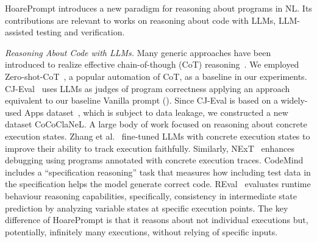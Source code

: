 \documentclass[sigconf]{acmart}
\newcommand{\projName}{HoarePrompt\xspace}
\newcommand{\benchName}{CoCoClaNeL\xspace}
\begin{document}


\projName introduces a new paradigm for reasoning about programs in NL. Its contributions are relevant to works on reasoning about code with LLMs, LLM-assisted testing and verification.



\textit{Reasoning About Code with LLMs.} Many generic approaches have been introduced to realize effective chain-of-though (CoT) reasoning~\cite{wei2022chain}. We employed Zero-shot-CoT~\cite{kojima2022large}, a popular automation of CoT, as a baseline in our experiments. CJ-Eval~\cite{zhao2024codejudge} uses LLMs as judges of program correctness applying an approach equivalent to our baseline Vanilla prompt (). Since CJ-Eval is based on a widely-used Apps dataset~\cite{apps}, which is subject to data leakage, we constructed a new dataset \benchName. A large body of work focused on reasoning about concrete execution states. Zhang et al.~\cite{grounding} fine-tuned LLMs with concrete execution states to improve their ability to track execution faithfully. Similarly, NExT~\cite{ni2024next} enhances debugging using programs annotated with concrete execution traces. CodeMind~\cite{liu2024codemind} includes a ``specification reasoning'' task that measures how including test data in the specification helps the model generate correct code. REval~\cite{runtime} evaluates runtime behaviour reasoning capabilities, specifically, consistency in intermediate state prediction by analyzing variable states at specific execution points. The key difference of \projName is that it reasons about not individual executions but, potentially, infinitely many executions, without relying of specific inputs.
\end{document}
